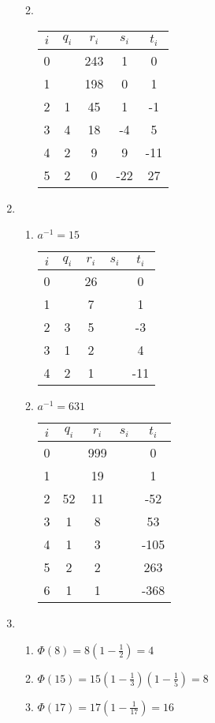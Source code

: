 \documentclass[12pt]{article}
\begin{document}
\begin{enumerate}
\begin{enumerate}
			\newpage
			\item %
			\quad \\
			\begin{tabular}{ c | c c | c c }
				$i$ & $q_i$ & $r_i$ & $s_i$ & $t_i$ \\ \hline
				0 &   & 243 &   1 &   0 \\
				1 &   & 198 &   0 &   1 \\
				2 & 1 &  45 &   1 &  -1 \\
				3 & 4 &  18 &  -4 &   5 \\
				4 & 2 &   9 &   9 & -11 \\
				5 & 2 &   0 & -22 &  27
			\end{tabular}
		\end{enumerate}
		
		\bigskip
		\item %
		\begin{enumerate}
			\item %
			$a^{-1} = 15$ \\
			\begin{tabular}{ c | c c | c c }
				$i$ & $q_i$ & $r_i$ & $s_i$ & $t_i$ \\ \hline
				0 &   & 26 &  &   0 \\
				1 &   &  7 &  &   1 \\
				2 & 3 &  5 &  &  -3 \\
				3 & 1 &  2 &  &   4 \\
				4 & 2 &  1 &  & -11
			\end{tabular}
			
			\bigskip
			\item %
			$a^{-1} = 631$ \\
			\begin{tabular}{ c | c c | c c }
				$i$ & $q_i$ & $r_i$ & $s_i$ & $t_i$ \\ \hline
				0 &    & 999 &  &    0 \\
				1 &    &  19 &  &    1 \\
				2 & 52 &  11 &  &  -52 \\
				3 &  1 &   8 &  &   53 \\
				4 &  1 &   3 &  & -105 \\
				5 &  2 &   2 &  &  263 \\
				6 &  1 &   1 &  & -368
			\end{tabular}
		\end{enumerate}
		
		\bigskip
		\item %
		\begin{enumerate}
			\item $\Phi(8) = 8(1 - \frac{1}{2}) = 4$
			\item $\Phi(15) = 15(1 - \frac{1}{3}) (1 - \frac{1}{5}) = 8$
			\item $\Phi(17) = 17(1 - \frac{1}{17}) = 16$
		\end{enumerate}
		

\end{enumerate}
\end{document}
